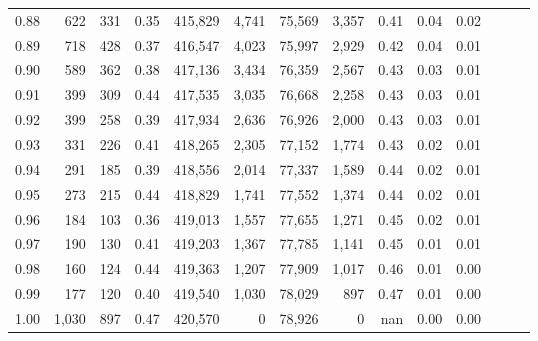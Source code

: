 \begin{tabular}{rrrrrrrrrrrrrr}
0.88 &     622 &    331 &  0.35 &  415,829 &    4,741 &  75,569 &   3,357 &  0.41 &  0.04 &      0.02 \\
0.89 &     718 &    428 &  0.37 &  416,547 &    4,023 &  75,997 &   2,929 &  0.42 &  0.04 &      0.01 \\
0.90 &     589 &    362 &  0.38 &  417,136 &    3,434 &  76,359 &   2,567 &  0.43 &  0.03 &      0.01 \\
0.91 &     399 &    309 &  0.44 &  417,535 &    3,035 &  76,668 &   2,258 &  0.43 &  0.03 &      0.01 \\
0.92 &     399 &    258 &  0.39 &  417,934 &    2,636 &  76,926 &   2,000 &  0.43 &  0.03 &      0.01 \\
0.93 &     331 &    226 &  0.41 &  418,265 &    2,305 &  77,152 &   1,774 &  0.43 &  0.02 &      0.01 \\
0.94 &     291 &    185 &  0.39 &  418,556 &    2,014 &  77,337 &   1,589 &  0.44 &  0.02 &      0.01 \\
0.95 &     273 &    215 &  0.44 &  418,829 &    1,741 &  77,552 &   1,374 &  0.44 &  0.02 &      0.01 \\
0.96 &     184 &    103 &  0.36 &  419,013 &    1,557 &  77,655 &   1,271 &  0.45 &  0.02 &      0.01 \\
0.97 &     190 &    130 &  0.41 &  419,203 &    1,367 &  77,785 &   1,141 &  0.45 &  0.01 &      0.01 \\
0.98 &     160 &    124 &  0.44 &  419,363 &    1,207 &  77,909 &   1,017 &  0.46 &  0.01 &      0.00 \\
0.99 &     177 &    120 &  0.40 &  419,540 &    1,030 &  78,029 &     897 &  0.47 &  0.01 &      0.00 \\
1.00 &   1,030 &    897 &  0.47 &  420,570 &        0 &  78,926 &       0 &   nan &  0.00 &      0.00 \\
\bottomrule
\end{tabular}
